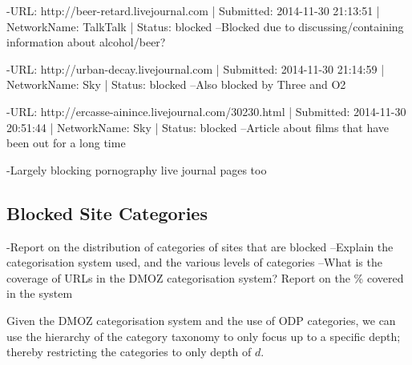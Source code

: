 \documentclass{bmcart}
\begin{document}
-URL: http://beer-retard.livejournal.com | Submitted: 2014-11-30 21:13:51 | NetworkName: TalkTalk | Status: blocked
--Blocked due to discussing/containing information about alcohol/beer?

-URL: http://urban-decay.livejournal.com | Submitted: 2014-11-30 21:14:59 | NetworkName: Sky | Status: blocked
--Also blocked by Three and O2

-URL: http://ercasse-ainince.livejournal.com/30230.html | Submitted: 2014-11-30 20:51:44 | NetworkName: Sky | Status: blocked
--Article about films that have been out for a long time

-Largely blocking pornography live journal pages too



\subsection*{Blocked Site Categories}
-Report on the distribution of categories of sites that are blocked
--Explain the categorisation system used, and the various levels of categories
--What is the coverage of URLs in the DMOZ categorisation system? Report on the \% covered in the system

Given the DMOZ categorisation system and the use of ODP categories, we can use the hierarchy of the category taxonomy to only focus up to a specific depth; thereby restricting the categories to only depth of $d$.
\end{document}
